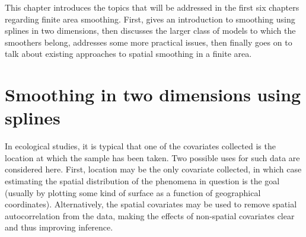 \label{chap-intro}

This chapter introduces the topics that will be addressed in the first six chapters regarding finite area smoothing. First,  gives an introduction to smoothing using splines in two dimensions,  then discusses the larger class of models to which the smoothers belong,  addresses some more practical issues, then finally  goes on to talk about existing approaches to spatial smoothing in a finite area.

\section{Smoothing in two dimensions using splines}
\label{intro-GAM}

In ecological studies, it is typical that one of the covariates collected is the location at which the sample has been taken. Two possible uses for such data are considered here. First, location may be the only covariate collected, in which case estimating the spatial distribution of the phenomena in question is the goal (usually by plotting some kind of surface as a function of geographical coordinates). Alternatively, the spatial covariates may be used to remove spatial autocorrelation from the data, making the effects of non-spatial covariates clear and thus improving inference.

